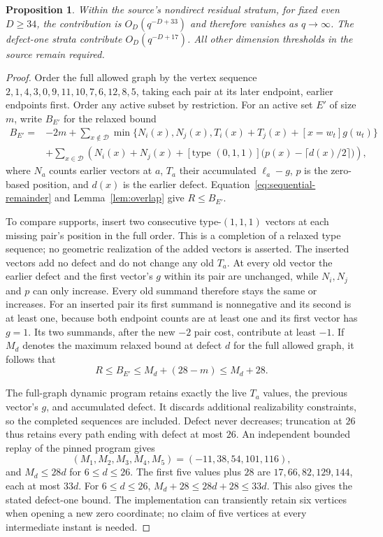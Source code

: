 \documentclass[11pt]{article}
\newtheorem{proposition}{Proposition}
\begin{document}
\begin{proposition}\label{prop:residual-33}
Within the source's nondirect residual stratum, for fixed even $D\ge34$,
the contribution is $O_D(q^{-D+33})$ and therefore vanishes as $q\to\infty$.
The defect-one strata contribute $O_D(q^{-D+17})$.
All other dimension thresholds in the source remain required.
\end{proposition}
\begin{proof}
Order the full allowed graph by the vertex sequence
$2,1,4,3,0,9,11,10,7,6,12,8,5$, taking each pair at its later endpoint,
earlier endpoints first. Order any active subset by restriction.
For an active set $E'$ of size $m$, write $B_{E'}$ for the relaxed bound
\begin{align*}
 B_{E'}={}&-2m+\sum_{x\notin\mathcal D}
 \min\{N_i(x),N_j(x),T_i(x)+T_j(x)+[x=w_t]g(u_t)\}\\
 &+\sum_{x\in\mathcal D}\left(N_i(x)+N_j(x)
 +[\text{type }(0,1,1)]\bigl(p(x)-\lceil d(x)/2\rceil\bigr)\right),
\end{align*}
where $N_a$ counts earlier vectors at $a$, $T_a$ their accumulated
$\ell_a-g$, $p$ is the zero-based position, and $d(x)$ is the earlier
defect. Equation~\eqref{eq:sequential-remainder} and
Lemma~\ref{lem:overlap} give $R\le B_{E'}$.

To compare supports, insert two consecutive type-$(1,1,1)$ vectors at
each missing pair's position in the full order. This is a completion of
a relaxed type sequence; no geometric realization of the added vectors
is asserted. The inserted vectors add no defect and do not change any old
$T_a$. At every old vector the earlier defect and the first vector's $g$
within its pair are unchanged, while $N_i,N_j$ and $p$ can only increase.
Every old summand therefore stays the same or increases. For an inserted
pair its first summand is nonnegative and its second is at least one,
because both endpoint counts are at least one and its first vector has
$g=1$. Its two summands, after the new $-2$ pair cost, contribute at least
$-1$. If $M_d$ denotes the maximum relaxed bound at defect $d$ for the
full allowed graph, it follows that
\[
 R\le B_{E'}\le M_d+(28-m)\le M_d+28.
\]

The full-graph dynamic program retains exactly the live $T_a$ values,
the previous vector's $g$, and accumulated defect. It discards additional
realizability constraints, so the completed sequences are included.
Defect never decreases; truncation at $26$ thus retains every path ending
with defect at most $26$. An independent bounded replay of the pinned
program gives
\[
 (M_1,M_2,M_3,M_4,M_5)=(-11,38,54,101,116),
\]
and $M_d\le28d$ for $6\le d\le26$. The first five values plus $28$ are
$17,66,82,129,144$, each at most $33d$. For $6\le d\le26$,
$M_d+28\le28d+28\le33d$. This also gives the stated defect-one bound.
The implementation can transiently retain six vertices when opening a
new zero coordinate; no claim of five vertices at every intermediate
instant is needed.


\end{proof}
\end{document}
